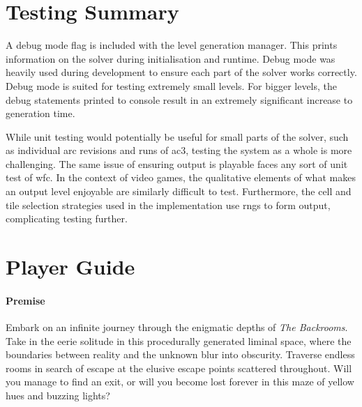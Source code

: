 \appendix
\chapter{Testing Summary}
A debug mode flag is included with the level generation manager. This prints information on the solver during initialisation and runtime. Debug mode was heavily used during development to ensure each part of the solver works correctly. Debug mode is suited for testing extremely small levels. For bigger levels, the debug statements printed to console result in an extremely significant increase to generation time.

While unit testing would potentially be useful for small parts of the solver, such as individual arc revisions and runs of \acrshort{ac3}, testing the system as a whole is more challenging. The same issue of ensuring output is playable faces any sort of unit test of \acrshort{wfc}. In the context of video games, the qualitative elements of what makes an output level enjoyable are similarly difficult to test. Furthermore, the cell and tile selection strategies used in the implementation use \acrshort{rng}s to form output, complicating testing further.

\chapter{Player Guide}
\subsubsection{Premise}

Embark on an infinite journey through the enigmatic depths of \textit{The Backrooms}. Take in the eerie solitude in this procedurally generated liminal space, where the boundaries between reality and the unknown blur into obscurity. Traverse endless rooms in search of escape at the elusive escape points scattered throughout. Will you manage to find an exit, or will you become lost forever in this maze of yellow hues and buzzing lights?

